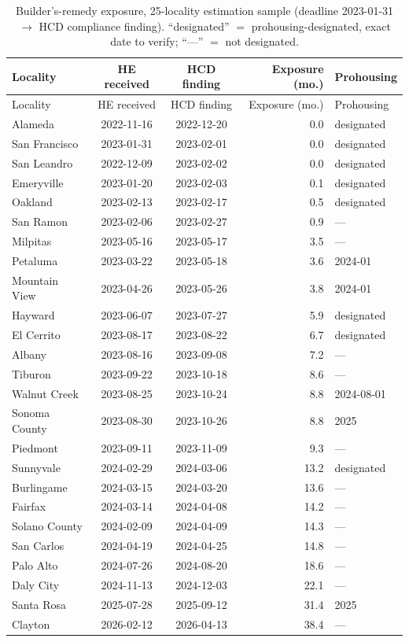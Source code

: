 \documentclass[11pt]{article}
\begin{document}
\begingroup\small
\begin{longtable}{@{}lccrl@{}}
\caption{Builder's-remedy exposure, 25-locality estimation sample (deadline 2023-01-31
$\rightarrow$ HCD compliance finding). ``designated'' $=$ prohousing-designated, exact date to
verify; ``---'' $=$ not designated.}\\
\toprule
Locality & HE received & HCD finding & Exposure (mo.) & Prohousing \\
\midrule
\endfirsthead
\toprule
Locality & HE received & HCD finding & Exposure (mo.) & Prohousing \\
\midrule
\endhead
\bottomrule
\endfoot
Alameda        & 2022-11-16 & 2022-12-20 & 0.0  & designated \\
San Francisco  & 2023-01-31 & 2023-02-01 & 0.0  & designated \\
San Leandro    & 2022-12-09 & 2023-02-02 & 0.0  & designated \\
Emeryville     & 2023-01-20 & 2023-02-03 & 0.1  & designated \\
Oakland        & 2023-02-13 & 2023-02-17 & 0.5  & designated \\
San Ramon      & 2023-02-06 & 2023-02-27 & 0.9  & --- \\
Milpitas       & 2023-05-16 & 2023-05-17 & 3.5  & --- \\
Petaluma       & 2023-03-22 & 2023-05-18 & 3.6  & 2024-01 \\
Mountain View  & 2023-04-26 & 2023-05-26 & 3.8  & 2024-01 \\
Hayward        & 2023-06-07 & 2023-07-27 & 5.9  & designated \\
El Cerrito     & 2023-08-17 & 2023-08-22 & 6.7  & designated \\
Albany         & 2023-08-16 & 2023-09-08 & 7.2  & --- \\
Tiburon        & 2023-09-22 & 2023-10-18 & 8.6  & --- \\
Walnut Creek   & 2023-08-25 & 2023-10-24 & 8.8  & 2024-08-01 \\
Sonoma County  & 2023-08-30 & 2023-10-26 & 8.8  & 2025 \\
Piedmont       & 2023-09-11 & 2023-11-09 & 9.3  & --- \\
Sunnyvale      & 2024-02-29 & 2024-03-06 & 13.2 & designated \\
Burlingame     & 2024-03-15 & 2024-03-20 & 13.6 & --- \\
Fairfax        & 2024-03-14 & 2024-04-08 & 14.2 & --- \\
Solano County  & 2024-02-09 & 2024-04-09 & 14.3 & --- \\
San Carlos     & 2024-04-19 & 2024-04-25 & 14.8 & --- \\
Palo Alto      & 2024-07-26 & 2024-08-20 & 18.6 & --- \\
Daly City      & 2024-11-13 & 2024-12-03 & 22.1 & --- \\
Santa Rosa     & 2025-07-28 & 2025-09-12 & 31.4 & 2025 \\
Clayton        & 2026-02-12 & 2026-04-13 & 38.4 & --- \\
\end{longtable}
\endgroup
\end{document}
